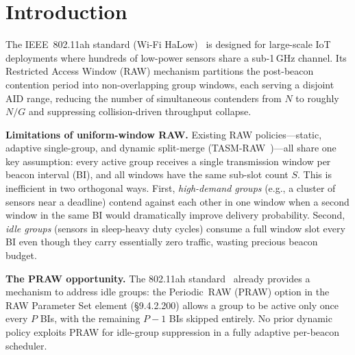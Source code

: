 \documentclass[conference]{IEEEtran}
\begin{document}
\section{Introduction}
\label{sec:intro}

The IEEE~802.11ah standard (Wi-Fi HaLow)~\cite{std80211ah} is designed
for large-scale IoT deployments where hundreds of low-power sensors
share a sub-1\,GHz channel.
Its Restricted Access Window (RAW) mechanism partitions the post-beacon
contention period into non-overlapping group windows, each serving a
disjoint AID range, reducing the number of simultaneous contenders from
$N$ to roughly $N/G$ and suppressing collision-driven throughput
collapse.

\textbf{Limitations of uniform-window RAW.}
Existing RAW policies---static, adaptive single-group, and dynamic
split-merge (TASM-RAW~\cite{kalita2025b})---all share one key assumption:
every active group receives a single transmission window per beacon
interval (BI), and all windows have the same sub-slot count $S$.
This is inefficient in two orthogonal ways.
First, \emph{high-demand groups} (e.g., a cluster of sensors near a
deadline) contend against each other in one window when a second window
in the same BI would dramatically improve delivery probability.
Second, \emph{idle groups} (sensors in sleep-heavy duty cycles)
consume a full window slot every BI even though they carry essentially
zero traffic, wasting precious beacon budget.

\textbf{The PRAW opportunity.}
The 802.11ah standard~\cite{std80211ah} already provides a mechanism to
address idle groups: the Periodic~RAW (PRAW) option in the RAW
Parameter Set element (\S9.4.2.200) allows a group to be active only
once every $P$ BIs, with the remaining $P-1$ BIs skipped entirely.
No prior dynamic policy exploits PRAW for idle-group suppression
in a fully adaptive per-beacon scheduler.
\end{document}
